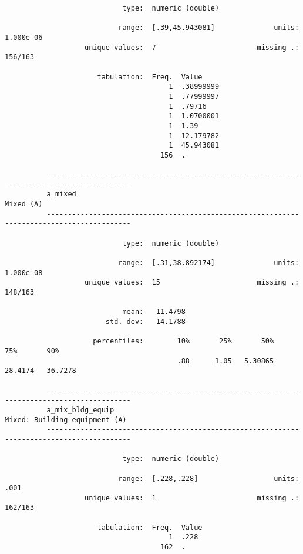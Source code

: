 \documentclass{article}
\begin{document}
\begin{verbatim}
                            type:  numeric (double)
          
                           range:  [.39,45.943081]              units:  1.000e-06
                   unique values:  7                        missing .:  156/163
          
                      tabulation:  Freq.  Value
                                       1  .38999999
                                       1  .77999997
                                       1  .79716
                                       1  1.0700001
                                       1  1.39
                                       1  12.179782
                                       1  45.943081
                                     156  .
          
          ------------------------------------------------------------------------------------------
          a_mixed                                                                          Mixed (A)
          ------------------------------------------------------------------------------------------
          
                            type:  numeric (double)
          
                           range:  [.31,38.892174]              units:  1.000e-08
                   unique values:  15                       missing .:  148/163
          
                            mean:   11.4798
                        std. dev:   14.1788
          
                     percentiles:        10%       25%       50%       75%       90%
                                         .88      1.05   5.30865   28.4174   36.7278
          
          ------------------------------------------------------------------------------------------
          a_mix_bldg_equip                                             Mixed: Building equipment (A)
          ------------------------------------------------------------------------------------------
          
                            type:  numeric (double)
          
                           range:  [.228,.228]                  units:  .001
                   unique values:  1                        missing .:  162/163
          
                      tabulation:  Freq.  Value
                                       1  .228
                                     162  .
          

\end{verbatim}
\end{document}
